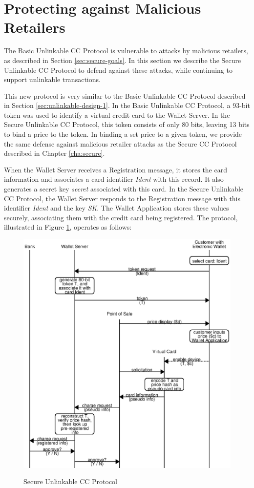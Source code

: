 \section{Protecting against Malicious Retailers}
\label{sec:unlinkable-design-2}

The Basic Unlinkable CC Protocol is vulnerable to attacks by malicious retailers, as described in Section \ref{sec:secure-goals}.
In this section we describe the Secure Unlinkable CC Protocol to defend against these attacks, while continuing to support unlinkable transactions.

This new protocol is very similar to the Basic Unlinkable CC Protocol described in Section \ref{sec:unlinkable-design-1}.
In the Basic Unlinkable CC Protocol, a 93-bit token was used to identify a virtual credit card to the Wallet Server.
In the Secure Unlinkable CC Protocol, this token consists of only 80 bits, leaving 13 bits to bind a price to the token.
In binding a set price to a given token, we provide the same defense against malicious retailer attacks as the Secure CC Protocol described in Chapter \ref{cha:secure}.

When the Wallet Server receives a Registration message, it stores the card information and associates a card identifier \emph{Ident} with this record.
It also generates a secret key \emph{secret} associated with this card.
In the Secure Unlinkable CC Protocol, the Wallet Server responds to the Registration message with this identifier \emph{Ident} and the key \emph{SK}.
The Wallet Application stores these values securely, associating them with the credit card being registered.
The protocol, illustrated in Figure \ref{fig:unlinkable-2}, operates as follows:

\begin{figure}[h!]
  \caption{Secure Unlinkable CC Protocol}
  \centering
    \includegraphics{img/unlinkable-2.eps}
  \label{fig:unlinkable-2}
\end{figure}

